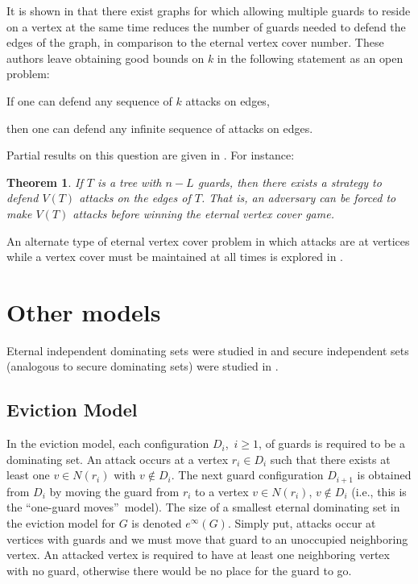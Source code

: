 \documentclass[12pt]{article}%
\newtheorem{theorem}{Theorem}[section]
\begin{document}
It is shown in \cite{gaspers2} that there exist graphs for which allowing
multiple guards to reside on a vertex at the same time reduces the number of
guards needed to defend the edges of the graph, in comparison to the eternal
vertex cover number. These authors leave obtaining good bounds on $k$ in the
following statement as an open problem:

\begin{center}
If one can defend any sequence of $k$ attacks on edges,

then one can defend any infinite sequence of attacks on edges.
\end{center}

\noindent Partial results on this question are given in \cite{ABC2}. For instance:

\begin{theorem}
\emph{\cite{ABC2}} If $T$ is a tree with $n-L$ guards, then there exists a
strategy to defend $V(T)$ attacks on the edges of $T$. That is, an adversary
can be forced to make $V(T)$ attacks before winning the eternal vertex cover game.
\end{theorem}

An alternate type of eternal vertex cover problem in which attacks are at
vertices while a vertex cover must be maintained at all times is explored in
\cite{KVC}.

\section{Other models}

\label{Sec_other} Eternal independent dominating sets were studied in
\cite{HM} and secure independent sets (analogous to secure dominating sets)
were studied in \cite{regan}.

\subsection{Eviction Model}

In the eviction model, each configuration $D_{i}$,\ $i\geq1$, of guards is
required to be a dominating set. An attack occurs at a vertex $r_{i}\in D_{i}$
such that there exists at least one $v\in N(r_{i})$ with $v\notin D_{i}$. The
next guard configuration $D_{i+1}$ is obtained from $D_{i}$ by moving the
guard from $r_{i}$ to a vertex $v\in N(r_{i})$, $v\notin D_{i}$ (i.e., this is
the \textquotedblleft one-guard moves\textquotedblright\ model). The size of a
smallest eternal dominating set in the eviction model for $G$ is denoted
$e^{\infty}(G)$. Simply put, attacks occur at vertices with guards and we must
move that guard to an unoccupied neighboring vertex. An attacked vertex is
required to have at least one neighboring vertex with no guard, otherwise
there would be no place for the guard to go.
\end{document}
